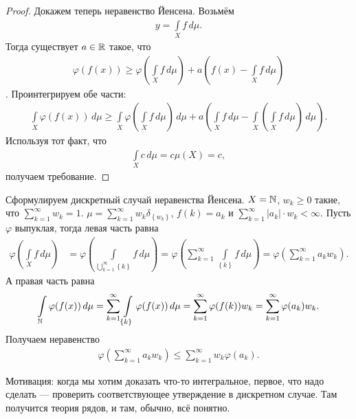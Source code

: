 \begin{proof}
 Докажем теперь неравенство Йенсена. Возьмём \begin{align*}
  y = \int\limits_{X} f \, d\mu  
 .\end{align*} Тогда существует $a \in \mathbb{R}$ такое, что \begin{align*}
  \varphi(f(x)) \geqslant \varphi \left( \int\limits_{X} f \, d\mu   \right) + a \left( f(x) - \int\limits_{X} f \, d\mu   \right)
 \end{align*}. Проинтегрируем обе части: \begin{align*}
  \int\limits_{X} \varphi(f(x)) \, d\mu   \geqslant \int\limits_{X} \varphi \left( \int\limits_{X} f \, d\mu   \right) \, d\mu  + a \left( \int\limits_{X} f \, d\mu - \int\limits_{X} \left( \int\limits_{X} f \, d\mu   \right) \, d\mu    \right)
 .\end{align*} Используя тот факт, что \begin{align*}
  \int\limits_{X} c \, d\mu  = c \mu(X) = c
 ,\end{align*} получаем требование.
\end{proof}
Сформулируем дискретный случай неравенства Йенсена. $X = \mathbb{N}$, $w_k \geqslant 0$ такие, что $\sum_{k=1}^{\infty} w_k = 1$. $\mu = \sum_{k=1}^{\infty} w_k \delta_{\left\{ w_k \right\}}$, $f(k) = a_k$ и  $\sum_{k=1}^{\infty} \left| a_k \right| \cdot w_k < \infty$. Пусть $\varphi$ выпуклая, тогда левая часть равна \begin{align*}
 \varphi \left( \int\limits_{X} f \, d\mu   \right) &= \varphi \left( \int\limits_{\bigcup_{k=1}^{\infty} \left\{ k \right\}} f \, d\mu   \right) = \varphi \left( \sum_{k=1}^{\infty} \int\limits_{\left\{ k \right\}} f \, d\mu   \right) = \varphi \left( \sum_{k=1}^{\infty} a_k w_k \right)
.\end{align*} А правая часть равна \begin{align*}
 \int\limits_{\mathbb{N}} \varphi(f(x)) \, d\mu  = \sum_{k=1}^{\infty} \int\limits_{\left\{ k \right\}} \varphi(f(x)) \, d\mu   = \sum_{k=1}^{\infty} \varphi(f(k)) w_k = \sum_{k=1}^{\infty} \varphi(a_k)w_k
.\end{align*} Получаем неравенство \begin{align*}
 \varphi \left( \sum_{k=1}^{\infty} a_k w_k \right) \leqslant \sum_{k=1}^{\infty} w_k \varphi(a_k)
.\end{align*} 

Мотивация: когда мы хотим доказать что-то интегральное, первое, что надо сделать --- проверить соответствующее утверждение в дискретном случае. Там получится теория рядов, и там, обычно, всё понятно.

